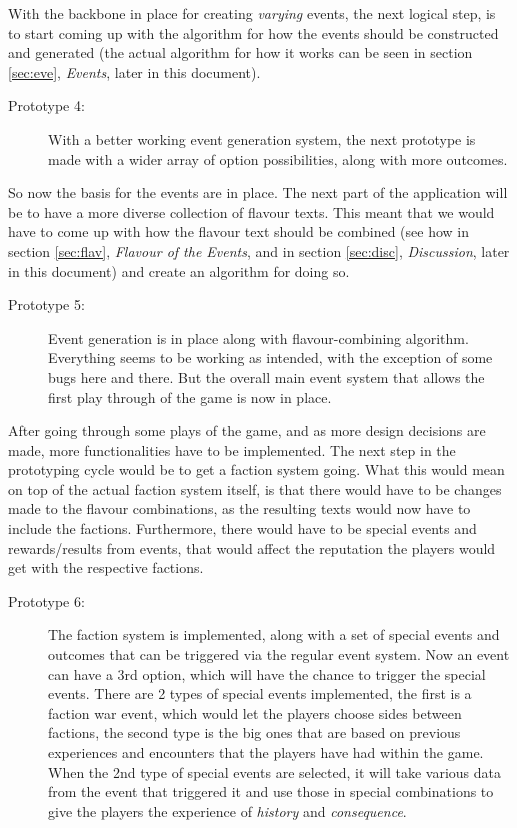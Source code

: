 With the backbone in place for creating \textit{varying} events, the next logical step, is to start coming up with the algorithm for how the events should be constructed and generated (the actual algorithm for how it works can be seen in section \ref{sec:eve}, \textit{Events}, later in this document).

\begin{description}
\item[Prototype 4:] With a better working event generation system, the next prototype is made with a wider array of option possibilities, along with more outcomes.
\end{description}

So now the basis for the events are in place. The next part of the application will be to have a more diverse collection of flavour texts.
This meant that we would have to come up with how the flavour text should be combined (see how in section \ref{sec:flav}, \textit{Flavour of the Events}, and in section \ref{sec:disc}, \textit{Discussion}, later in this document) and create an algorithm for doing so. 

\begin{description}
\item[Prototype 5:] Event generation is in place along with flavour-combining algorithm. Everything seems to be working as intended, with the exception of some bugs here and there. But the overall main event system that allows the first play through of the game is now in place.
\end{description}

After going through some plays of the game, and as more design decisions are made, more functionalities have to be implemented. The next step in the prototyping cycle would be to get a faction system going. What this would mean on top of the actual faction system itself, is that there would have to be changes made to the flavour combinations, as the resulting texts would now have to include the factions. Furthermore, there would have to be special events and rewards/results from events, that would affect the reputation the players would get with the respective factions.

\begin{description}
\item[Prototype 6:]
The faction system is implemented, along with a set of special events and outcomes that can be triggered via the regular event system. Now an event can have a 3rd option, which will have the chance to trigger the special events. There are 2 types of special events implemented, the first is a faction war event, which would let the players choose sides between factions, the second type is the big ones that are based on previous experiences and encounters that the players have had within the game. When the 2nd type of special events are selected, it will take various data from the event that triggered it and use those in special combinations to give the players the experience of \textit{history} and \textit{consequence}.
\end{description}

